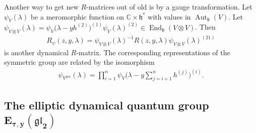 \documentclass[10pt,a4paper]{amsart}
\numberwithin{equation}{section}
\begin{document}
Another way to get new $R$-matrices out of old is by a gauge transformation. Let $\psi_V(\lambda)$ be a meromorphic function on $\mathbb C\times \mathfrak h^*$ with values in $\operatorname{Aut}_{\mathfrak h}(V)$. Let
$\psi_{V\otimes V}(\lambda)=\psi_V\big(\lambda-y h^{(2)}\big)^{(1)}\psi_V(\lambda)^{(2)}\in\operatorname{End}_{\mathfrak h}(V\otimes V)$. Then
\begin{gather*}
 R_\psi(z,y,\lambda)=\psi_{V\otimes V}(\lambda)^{-1}R(z,y,\lambda)\psi_{V\otimes V}(\lambda)^{(21)}
\end{gather*}
is another dynamical $R$-matrix. The corresponding representations of the symmetric group are related by the isomorphism
\begin{gather*} \psi_{V^{\otimes n}}(\lambda)=\prod_{i=1}^n\psi_{V}\bigg(\lambda-y\sum_{j=i+1}^nh^{(j)}\bigg)^{(i)}.\end{gather*}

\subsection[The elliptic dynamical quantum group $E_{\tau,y}(\mathfrak{gl}_2)$]{The elliptic dynamical quantum group $\boldsymbol{E_{\tau,y}(\mathfrak{gl}_2)}$}\label{ss-2.3}
\end{document}
